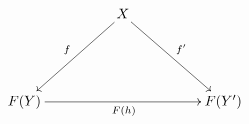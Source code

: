 \documentclass{standalone}
\begin{document}
\Large
\(\displaystyle
\xymatrix@C+24pt@R+24pt{
&  X 
\ar[dr]^{f'} 
\ar[dl]_{f} 
  &  \\
F(Y) \ar[rr]_{F(h)}
& 
& 
F(Y') \\
}
\)
\end{document}
